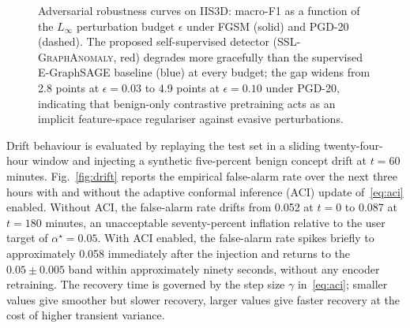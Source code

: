 \documentclass[journal,twoside]{IEEEtran}
\begin{document}
\begin{figure}[t]
\centering
{}
\caption{Adversarial robustness curves on IIS3D: macro-F1 as a function
of the $L_\infty$ perturbation budget $\epsilon$ under FGSM (solid) and
PGD-20 (dashed). The proposed self-supervised detector
(\textsc{SSL-GraphAnomaly}, red) degrades more gracefully than the
supervised E-GraphSAGE baseline (blue) at every budget; the gap widens
from 2.8 points at $\epsilon = 0.03$ to 4.9 points at $\epsilon = 0.10$
under PGD-20, indicating that benign-only contrastive pretraining acts as
an implicit feature-space regulariser against evasive perturbations.}
\label{fig:advrob}
\end{figure}

Drift behaviour is evaluated by replaying the test set in a sliding
twenty-four-hour window and injecting a synthetic five-percent benign
concept drift at $t = 60$ minutes. Fig.~\ref{fig:drift} reports the
empirical false-alarm rate over the next three hours with and without
the adaptive conformal inference (ACI) update of~\eqref{eq:aci} enabled.
Without ACI, the false-alarm rate drifts from 0.052 at $t = 0$ to 0.087
at $t = 180$ minutes, an unacceptable seventy-percent inflation relative
to the user target of $\alpha^\star = 0.05$. With ACI enabled, the
false-alarm rate spikes briefly to approximately 0.058 immediately after
the injection and returns to the $0.05 \pm 0.005$ band within
approximately ninety seconds, without any encoder retraining. The
recovery time is governed by the step size $\gamma$ in~\eqref{eq:aci};
smaller values give smoother but slower recovery, larger values give
faster recovery at the cost of higher transient variance.
\end{document}
